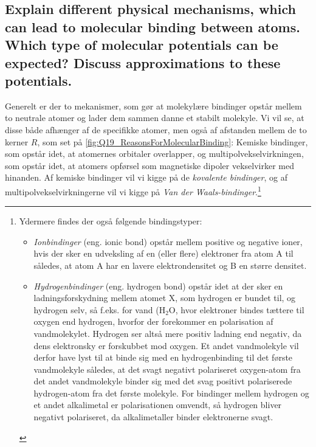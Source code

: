 \subsection{Explain different physical mechanisms, which can lead to molecular binding between atoms. Which type of molecular potentials can be expected? Discuss approximations to these potentials.}


Generelt er der to mekanismer, som gør at molekylære bindinger opstår mellem to neutrale atomer og lader dem sammen danne et stabilt molekyle. Vi vil se, at disse både afhænger af de specifikke atomer, men også af afstanden mellem de to kerner $R$, som set på \cref{fig:Q19_ReasonsForMolecularBinding}: Kemiske bindinger, som opstår idet, at atomernes orbitaler overlapper, og multipolvekselvirkningen, som opstår idet, at atomers opførsel som magnetiske dipoler vekselvirker med hinanden. Af kemiske bindinger vil vi kigge på de \emph{kovalente bindinger}, og af multipolvekselvirkningerne vil vi kigge på \emph{Van der Waals-bindinger}.\footnote{
    Ydermere findes der også følgende bindingstyper:
    \begin{itemize}
        \item \emph{Ionbindinger} (eng. ionic bond) opstår mellem positive og negative ioner, hvis der sker en udveksling af en (eller flere) elektroner fra atom A til  således, at atom A har en lavere elektrondensitet og B en større densitet.
        \item \emph{Hydrogenbindinger} (eng. hydrogen bond) opstår idet at der sker en ladningsforskydning mellem atomet X, som hydrogen er bundet til, og hydrogen selv, så f.eks. for vand ($\text{H}_2\text{O}$, hvor elektroner bindes tættere til oxygen end hydrogen, hvorfor der forekommer en polarisation af vandmolekylet. Hydrogen ser altså mere positiv ladning end negativ, da dens elektronsky er forskubbet mod oxygen. Et andet vandmolekyle vil derfor have lyst til at binde sig med en hydrogenbinding til det første vandmolekyle således, at det svagt negativt polariseret oxygen-atom fra det andet vandmolekyle binder sig med det svag positivt polariserede hydrogen-atom fra det første molekyle. For bindinger mellem hydrogen og et andet alkalimetal er polarisationen omvendt, så hydrogen bliver negativt polariseret, da alkalimetaller binder elektronerne svagt.
    \end{itemize}
}

